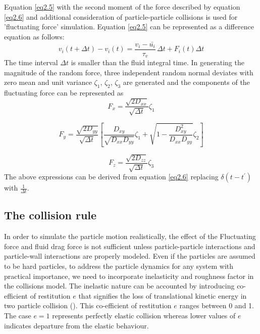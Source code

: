 \documentclass[notitlepage]{revtex4-1}
\begin{document}
Equation \ref{eq2.5} with the second moment of the force described by equation \ref{eq2.6} and additional consideration of particle-particle collisions is used for  'fluctuating force' simulation. 
Equation \ref{eq2.5} can be represented as a difference equation as follows:
\begin{equation}
	\label{eq2.7}
	v_i(t+\Delta t)-v_i(t)=\frac{v_i-\bar{u_i}}{\tau_v}\,\Delta t+F_i(t)\Delta t
\end{equation}
The time interval $\Delta t$  is smaller than the fluid integral time. In generating the magnitude of the random force, three independent random normal deviates with zero mean and unit variance $\zeta_1$, $\zeta_2$, $\zeta_3$ are generated and the components of the
fluctuating force can be represented as
\begin{equation}
	\label{eq2.11}
	F_x=\frac{\sqrt{2D_{xx}}}{\sqrt{\Delta t}}\zeta_1
\end{equation}

\begin{equation}
	\label{eq2.12}
	F_y=\frac{\sqrt{2D_{yy}}}{\sqrt{\Delta t}}\left[\frac{D_{xy}}{\sqrt{D_{xx}D_{yy}}}\zeta_1+ \sqrt{1-\frac{D_{xy}^2}{D_{xx}D_{yy}}}\zeta_2 \right]
\end{equation}

\begin{equation}
	\label{eq2.13}
	F_z=\frac{\sqrt{2D_{zz}}}{\sqrt{\Delta t}}\zeta_3
\end{equation}
The above expressions can be derived from equation \ref{eq2.6} replacing $\delta (t-t^{\prime})$ with
$\frac{1}{{\Delta}t}$. 
\subsection{The collision rule}
\label{sec:coll_rule}
In order to simulate the particle motion realistically, the effect of the Fluctuating force and fluid drag force is not sufficient unless particle-particle interactions and particle-wall interactions are properly modeled. Even if the particles are assumed to be hard particles, to address the particle dynamics for any system with practical importance, we need to  incorporate inelasticity and roughness factor in the collisions model. The inelastic nature can be accounted by introducing co-efficient of restitution $e$ that signifies the loss of translational kinetic energy in two particle collision (\textcolor{black} {\citet{bose2004velocity}}). This co-efficient of restitution $e$ ranges between 0 and 1. The case $e=1$ represents perfectly elastic collision whereas lower values of $e$ indicates departure from the elastic behaviour.
\end{document}
